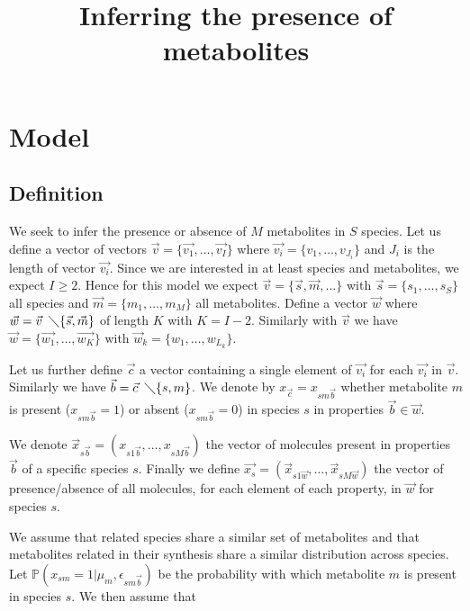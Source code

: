 \documentclass[a4paper,10pt]{article}
\title{Inferring the presence of metabolites}
\def\P{\mathbb{P}}
\begin{document}
\maketitle

\section{Model}

	\subsection{Definition} \label{subsec:definition}
	We seek to infer the presence or absence of $M$ metabolites in $S$ species. Let us define a vector of vectors $\vec{v} = \{\vec{v_1}, \ldots, \vec{v_I}\}$ where $\vec{v_i} = \{v_1, \ldots, v_{J_i}\}$ and $J_i$ is the length of vector $\vec{v_i}$. Since we are interested in at least species and metabolites, we expect $I \geq 2$. Hence for this model we expect $\vec{v} = \{\vec{s}, \vec{m}, \ldots\}$ with $\vec{s} = \{s_1, \ldots, s_S\}$ all species and $\vec{m} = \{m_1, \ldots, m_M\}$ all metabolites. Define a vector $\vec{w}$ where $\vec{w} = \vec{v} \hspace{0.5em} \diagdown \{\vec{s}, \vec{m}\}$ of length $K$ with $K = I -2$. Similarly with $\vec{v}$ we have $\vec{w} = \{\vec{w_1}, \ldots, \vec{w_K}\}$ with $\vec{w}_k = \{w_1, \ldots, w_{L_k}\}$.
	
	Let us further define $\vec{c}$ a vector containing a single element of $\vec{v_i}$ for each $\vec{v_i}$ in $\vec{v}$. Similarly we have $\vec{b} = \vec{c} \hspace{0.5em} \diagdown \{s, m\}$.  We denote by $x_{\vec{c}} = x_{sm\vec{b}}$ whether metabolite $m$ is present ($x_{sm\vec{b}}=1$) or absent ($x_{sm\vec{b}}=0$) in species $s$ in properties $\vec{b} \in \vec{w}$.
	
	We denote $\vec{x}_{s\vec{b}} = (x_{s1\vec{b}}, \ldots, x_{sM\vec{b}})$ the vector of molecules present in properties $\vec{b}$ of a specific species $s$. Finally we define $\vec{x_s} = (\vec{x}_{s1\vec{w}}, \ldots, \vec{x}_{sM\vec{w}})$ the vector of presence/absence of all molecules, for each element of each property, in $\vec{w}$ for species $s$.
	
	We assume that related species share a similar set of metabolites and that metabolites related in their synthesis share a similar distribution across species. Let $\P(x_{sm}=1|\mu_m, \epsilon_{sm\vec{b}})$ be the probability with which metabolite $m$ is present in species $s$. We then assume that
	
\end{document}
